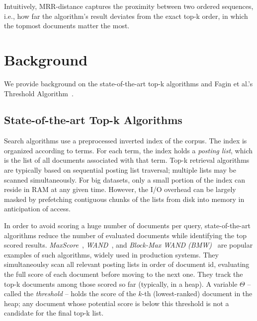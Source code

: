 \noindent
Intuitively, MRR-distance captures the proximity between two ordered sequences, i.e., how far the algorithm's result deviates from the exact top-k order, 
in which the topmost documents matter the most.  


\section{Background}
\label{sec:background}

We provide background on the state-of-the-art top-k algorithms and Fagin et al.'s Threshold Algorithm~\cite{Fagin:2003}.

\subsection{State-of-the-art Top-k Algorithms}

Search algorithms use a preprocessed inverted index of the corpus. The index is organized according to terms. For each term, the index holds a \emph{posting list}, which is the list of all documents associated with that term. Top-k retrieval algorithms are typically based on sequential posting list traversal; multiple lists may be scanned simultaneously. For big datasets, only a small portion of the index can reside in RAM at any given time. However, the I/O overhead can be largely masked by prefetching contiguous chunks of the lists from disk into memory in anticipation of access.

In order to avoid scoring a huge number of documents per query, state-of-the-art algorithms reduce the number of evaluated documents while identifying the top scored results. 
{\em MaxScore}~\cite{Strohman:2005,Turtle:1995}, {\em WAND}~\cite{Broder:2003}, and {\em Block-Max WAND (BMW)}~\cite{Ding:2011} are popular examples of such algorithms, widely used in production systems. 
They  simultaneoulsy scan all relevant posting lists in order of document id, evaluating the full score of each document before moving to the next one. They track the top-k documents among those scored so far (typically, in a heap). A variable $\Theta$ -- called the \emph{threshold} -- holds the score of the $k$-th (lowest-ranked) document in the heap;  any document whose potential score is below this threshold is not a candidate for the final top-k list.

